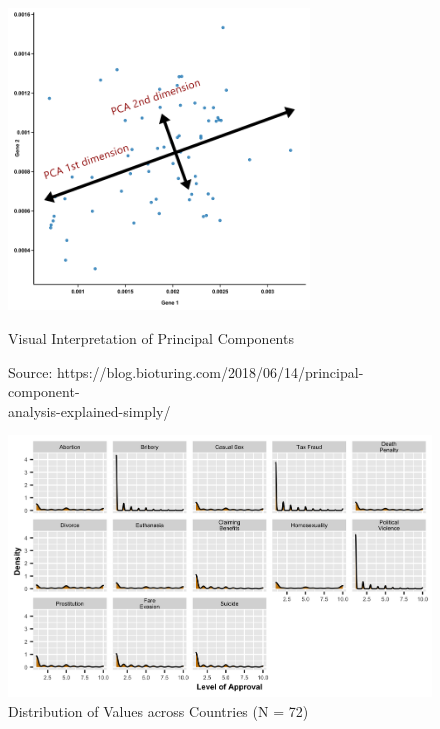 \documentclass{article}[hidelinks]
\begin{document}
\begin{figure}[h]
    \centering
    \includegraphics[width=80mm]{PCA.png}
    \caption{Visual Interpretation of Principal Components}
    \label{fig:PCA}
    \vspace{-9pt}
    \caption*{Source: https://blog.bioturing.com/2018/06/14/principal-component- \\ analysis-explained-simply/}
\end{figure}

\begin{figure}[h]
    \centering
    \includegraphics[width=130mm]{histogramm.png}
    \caption{Distribution of Values across Countries (N = 72)}
    \label{fig:histogramm}
    
\end{figure}
\end{document}
